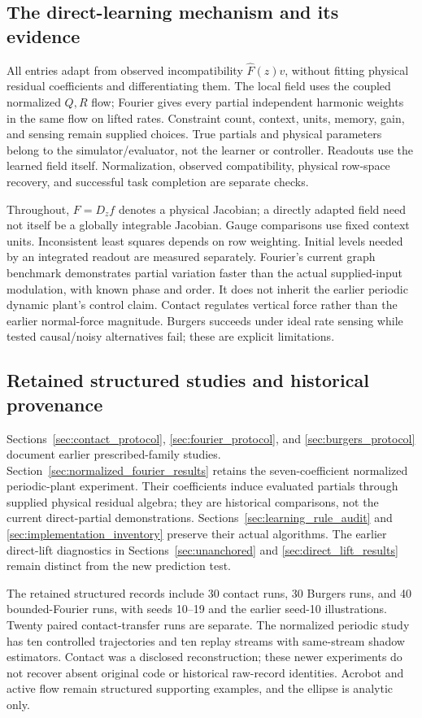 \documentclass[journal]{IEEEtran}
\begin{document}
\subsection*{The direct-learning mechanism and its evidence}
All entries adapt from observed incompatibility $\widehat F(z)v$, without
fitting physical residual coefficients and differentiating them. The local
field uses the coupled normalized $Q,R$ flow; Fourier gives every partial
independent harmonic weights in the same flow on lifted rates. Constraint
count, context, units, memory, gain, and sensing remain supplied choices.
True partials and physical parameters belong to the simulator/evaluator,
not the learner or controller. Readouts use the learned field itself.
Normalization, observed compatibility, physical row-space recovery, and
successful task completion are separate checks.

Throughout, $F=D_zf$ denotes a physical Jacobian; a directly adapted field
need not itself be a globally integrable Jacobian. Gauge comparisons use
fixed context units. Inconsistent least squares depends on row weighting.
Initial levels needed by an integrated readout are measured separately.
Fourier's current graph benchmark demonstrates partial variation faster
than the actual supplied-input modulation, with known phase and order.
It does not inherit the earlier periodic dynamic plant's control claim.
Contact regulates vertical force rather than the earlier normal-force
magnitude. Burgers succeeds under ideal rate sensing while tested
causal/noisy alternatives fail; these are explicit limitations.

\subsection*{Retained structured studies and historical provenance}
Sections~\ref{sec:contact_protocol}, \ref{sec:fourier_protocol}, and
\ref{sec:burgers_protocol} document earlier prescribed-family studies.
Section~\ref{sec:normalized_fourier_results} retains the seven-coefficient
normalized periodic-plant experiment. Their coefficients induce evaluated
partials through supplied physical residual algebra; they are historical
comparisons, not the current direct-partial demonstrations.
Sections~\ref{sec:learning_rule_audit} and
\ref{sec:implementation_inventory} preserve their actual algorithms.
The earlier direct-lift diagnostics in Sections~\ref{sec:unanchored} and
\ref{sec:direct_lift_results} remain distinct from the new prediction test.

The retained structured records include 30 contact runs, 30 Burgers runs,
and 40 bounded-Fourier runs, with seeds 10--19 and the earlier seed-10
illustrations. Twenty paired contact-transfer runs are separate.
The normalized periodic study has ten controlled trajectories and ten
replay streams with same-stream shadow estimators. Contact was a disclosed
reconstruction; these newer experiments do not recover absent original
code or historical raw-record identities. Acrobot and active flow remain
structured supporting examples, and the ellipse is analytic only.
\end{document}
